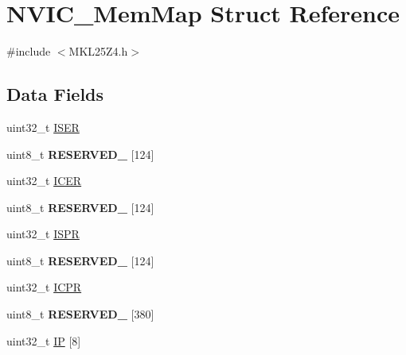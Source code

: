 \hypertarget{struct_n_v_i_c___mem_map}{}\section{N\+V\+I\+C\+\_\+\+Mem\+Map Struct Reference}
\label{struct_n_v_i_c___mem_map}


{\ttfamily \#include $<$M\+K\+L25\+Z4.\+h$>$}

\subsection*{Data Fields}
\begin{DoxyCompactItemize}
\item 
uint32\+\_\+t \hyperlink{struct_n_v_i_c___mem_map_aef94884a5cbb2f5260df2e30cf0c954f}{I\+S\+E\+R}
\item 
\hypertarget{struct_n_v_i_c___mem_map_a23a59a3d696222ce8eb7d473645fee33}{}uint8\+\_\+t {\bfseries R\+E\+S\+E\+R\+V\+E\+D\+\_} \mbox{[}124\mbox{]}\label{struct_n_v_i_c___mem_map_a23a59a3d696222ce8eb7d473645fee33}

\item 
uint32\+\_\+t \hyperlink{struct_n_v_i_c___mem_map_a60d6d4189f66d2ee451e0516db827fd1}{I\+C\+E\+R}
\item 
\hypertarget{struct_n_v_i_c___mem_map_a5916fcc22314a0bfd965e62b9fa733b7}{}uint8\+\_\+t {\bfseries R\+E\+S\+E\+R\+V\+E\+D\+\_} \mbox{[}124\mbox{]}\label{struct_n_v_i_c___mem_map_a5916fcc22314a0bfd965e62b9fa733b7}

\item 
uint32\+\_\+t \hyperlink{struct_n_v_i_c___mem_map_a9948e5816be3cb53ef9d27229eaf2d84}{I\+S\+P\+R}
\item 
\hypertarget{struct_n_v_i_c___mem_map_a53e744343069d137fd884b830e971004}{}uint8\+\_\+t {\bfseries R\+E\+S\+E\+R\+V\+E\+D\+\_} \mbox{[}124\mbox{]}\label{struct_n_v_i_c___mem_map_a53e744343069d137fd884b830e971004}

\item 
uint32\+\_\+t \hyperlink{struct_n_v_i_c___mem_map_a2dcec5c8c1f5ce5c6121b5b718b1b685}{I\+C\+P\+R}
\item 
\hypertarget{struct_n_v_i_c___mem_map_a19f786736ec5a1004fb2811eacc76f13}{}uint8\+\_\+t {\bfseries R\+E\+S\+E\+R\+V\+E\+D\+\_} \mbox{[}380\mbox{]}\label{struct_n_v_i_c___mem_map_a19f786736ec5a1004fb2811eacc76f13}

\item 
uint32\+\_\+t \hyperlink{struct_n_v_i_c___mem_map_a1f22f7bba4536ada7f0655d30ac628d4}{I\+P} \mbox{[}8\mbox{]}
\end{DoxyCompactItemize}


